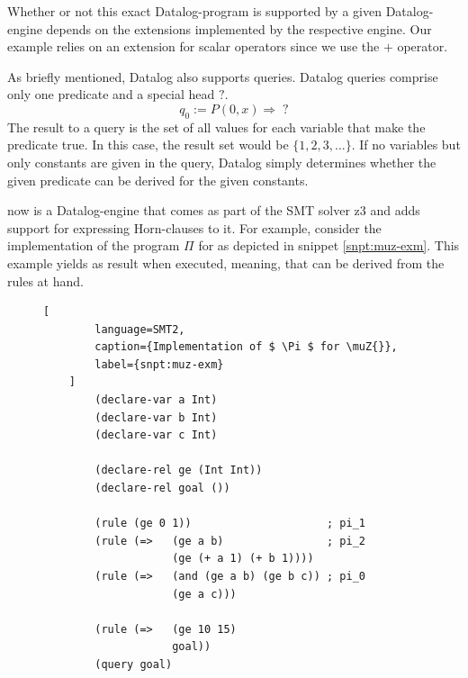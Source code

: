 Whether or not this exact Datalog-program is supported by a given Datalog-engine depends on the extensions implemented by the respective engine.
Our example relies on an extension for scalar operators since we use the $ + $ operator.

As briefly mentioned, Datalog also supports queries.
Datalog queries comprise only one predicate and a special head $ ? $.
\begin{equation*}
    q_0 := P(0, x) \Rightarrow \; ?
\end{equation*}
The result to a query is the set of all values for each variable that make the predicate true.
In this case, the result set would be $ \{ 1, 2, 3, \dots \} $.
If no variables but only constants are given in the query, Datalog simply determines whether the given predicate can be derived for the given constants.

\muZ{} now is a Datalog-engine that comes as part of the SMT solver z3 \cite{Moura08} and adds support for expressing Horn-clauses to it.
For example, consider the implementation of the program $ \Pi $ for \muZ{} as depicted in snippet \ref{snpt:muz-exm}.
This example yields  as result when executed, meaning, that  can be derived from the rules at hand.

\begin{figure}
    \begin{lstlisting}[
        language=SMT2,
        caption={Implementation of $ \Pi $ for \muZ{}},
        label={snpt:muz-exm}
    ]
        (declare-var a Int)
        (declare-var b Int)
        (declare-var c Int)

        (declare-rel ge (Int Int))
        (declare-rel goal ())

        (rule (ge 0 1))                     ; pi_1
        (rule (=>   (ge a b)                ; pi_2
                    (ge (+ a 1) (+ b 1))))
        (rule (=>   (and (ge a b) (ge b c)) ; pi_0
                    (ge a c)))

        (rule (=>   (ge 10 15)
                    goal))
        (query goal)
    \end{lstlisting}
\end{figure}


